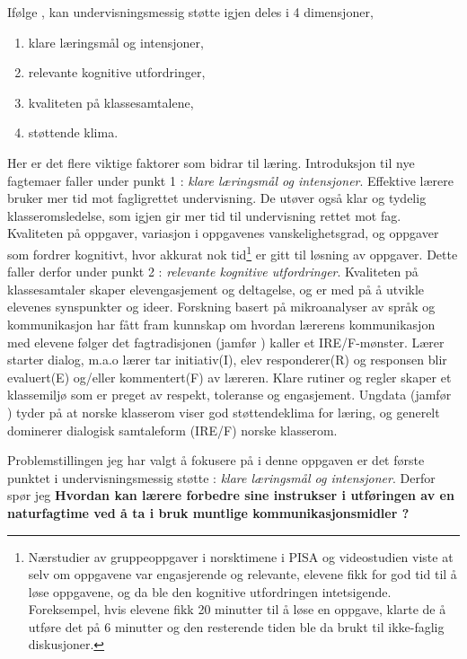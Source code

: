 \documentclass[main.tex]{subfiles}
\begin{document}
Ifølge , kan undervisningsmessig støtte igjen deles i 4 dimensjoner,
\begin{enumerate}
\item klare læringsmål og intensjoner,
\item relevante kognitive utfordringer,
\item kvaliteten på klassesamtalene,
\item støttende klima.
\end{enumerate}
Her er det flere viktige faktorer som bidrar til læring. Introduksjon til nye fagtemaer faller 
under punkt 1 : \emph{klare læringsmål og intensjoner}. Effektive lærere bruker mer tid mot 
fagligrettet undervisning. De utøver også klar og tydelig klasseromsledelse, som igjen gir mer tid 
til undervisning rettet mot fag. Kvaliteten på oppgaver, variasjon i oppgavenes vanskelighetsgrad, 
og oppgaver som fordrer kognitivt, hvor akkurat nok tid\footnote{
Nærstudier av gruppeoppgaver i norsktimene i PISA og videostudien  viste at selv om 
oppgavene var engasjerende og relevante, elevene fikk for god tid til å løse oppgavene, og da ble 
den kognitive utfordringen intetsigende. Foreksempel, hvis elevene fikk 20 minutter til å løse en 
oppgave, klarte de å utføre det på 6 minutter og den resterende tiden ble da brukt til ikke-faglig 
diskusjoner.} 
er gitt til løsning av oppgaver. Dette faller derfor under punkt 2 : \emph{relevante kognitive 
utfordringer}. Kvaliteten på klassesamtaler skaper elevengasjement og deltagelse, og er med på å 
utvikle elevenes synspunkter og ideer. Forskning basert på mikroanalyser av språk og kommunikasjon 
har fått fram kunnskap om hvordan lærerens kommunikasjon med elevene følger det fagtradisjonen 
(jamfør ) kaller et IRE/F-mønster. Lærer starter dialog, m.a.o lærer tar 
initiativ(I), elev responderer(R) og responsen blir evaluert(E) og/eller kommentert(F) av læreren.
Klare rutiner og regler skaper et klassemiljø som er preget av respekt, toleranse og engasjement. 
Ungdata (jamfør ) tyder på at norske klasserom viser god støttendeklima for læring, 
og generelt dominerer dialogisk samtaleform (IRE/F) norske klasserom.
\newline

Problemstillingen jeg har valgt å fokusere på i denne oppgaven er det første punktet i 
undervisningsmessig støtte : \emph{klare læringsmål og intensjoner}. Derfor spør jeg 
\newline
\newline
\textbf{Hvordan kan lærere forbedre sine instrukser i utføringen av en naturfagtime ved å ta i bruk 
muntlige kommunikasjonsmidler ?}
\newline
\end{document}
